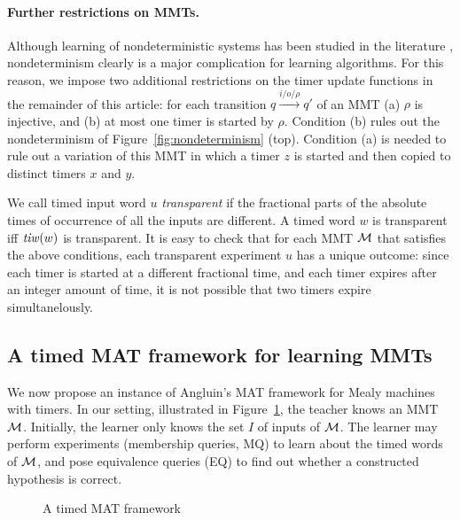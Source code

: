 \paragraph{Further restrictions on MMTs.}
Although learning of nondeterministic systems has been studied in the literature \cite{VolpatoT14},
nondeterminism clearly is a major complication for learning algorithms. For this reason, we impose two additional
restrictions on the timer update functions in the remainder of this article:
for each transition $q \xrightarrow{i/o/\rho} q'$
of an MMT (a) $\rho$ is injective, and (b) at most one timer is started by $\rho$.
Condition (b) rules out the nondeterminism of Figure~\ref{fig:nondeterminism} (top).
Condition (a) is needed to rule out a variation of this MMT in which a timer $z$ is started and then copied to distinct
timers $x$ and $y$.

We call timed input word $u$ \emph{transparent} if the fractional parts of the absolute times of occurrence of
all the inputs are different.
A timed word $w$ is transparent iff $\mathit{tiw}(w)$ is transparent.
It is easy to check that for each MMT ${\mathcal M}$ that satisfies the above conditions,
each transparent experiment $u$ has a unique outcome: since each timer is started at a different fractional time,
and each timer expires after an integer amount of time, it is not possible that two timers expire simultanelously.

\subsection{A timed MAT framework for learning MMTs}
We now propose an instance of Angluin's MAT framework for Mealy machines with timers.
In our setting, illustrated in Figure~\ref{fig timed MAT}, the teacher knows an MMT ${\mathcal M}$.
Initially, the learner only knows the set $I$ of inputs of ${\mathcal M}$.
The learner may perform experiments (membership queries, MQ) to learn about the
timed words of ${\mathcal M}$, and  pose equivalence queries (EQ) to find out whether a constructed hypothesis is correct.

\begin{figure}[h]
\begin{center}
\end{center} 
\caption{A timed MAT framework}
\label{fig timed MAT}
\end{figure}

